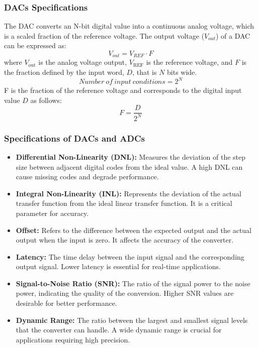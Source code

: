 \subsubsection{DACs Specifications}
The DAC converts an N-bit digital value into a continuous analog voltage, which is a scaled fraction of the reference voltage.
The output voltage (\(V_{out}\)) of a DAC can be expressed as:
\begin{equation}
    V_{out} = V_{REF} \cdot F
\end{equation}
where \(V_{\text{out}}\) is the analog voltage output, \(V_{\text{REF}}\) is the reference voltage, and \(F\) is the fraction defined by the input word, \(D\), that is \(N\) bits wide.
\begin{equation}
    Number\ of\ input\ conditions = 2^N
\end{equation}
F is the fraction of the reference voltage and corresponds to the digital input value \(D\) as follows:
\begin{equation}
    F = \frac{D}{2^N}
\end{equation}
\subsubsection{Specifications of DACs and ADCs}
\begin{itemize}
    \item \textbf{Differential Non-Linearity (DNL):} Measures the deviation of the step size between adjacent digital codes from the ideal value. A high DNL can cause missing codes and degrade performance.
    \item \textbf{Integral Non-Linearity (INL):} Represents the deviation of the actual transfer function from the ideal linear transfer function. It is a critical parameter for accuracy.
    \item \textbf{Offset:} Refers to the difference between the expected output and the actual output when the input is zero. It affects the accuracy of the converter.
    \item \textbf{Latency:} The time delay between the input signal and the corresponding output signal. Lower latency is essential for real-time applications.
    \item \textbf{Signal-to-Noise Ratio (SNR):} The ratio of the signal power to the noise power, indicating the quality of the conversion. Higher SNR values are desirable for better performance.
    \item \textbf{Dynamic Range:} The ratio between the largest and smallest signal levels that the converter can handle. A wide dynamic range is crucial for applications requiring high precision.
\end{itemize}
